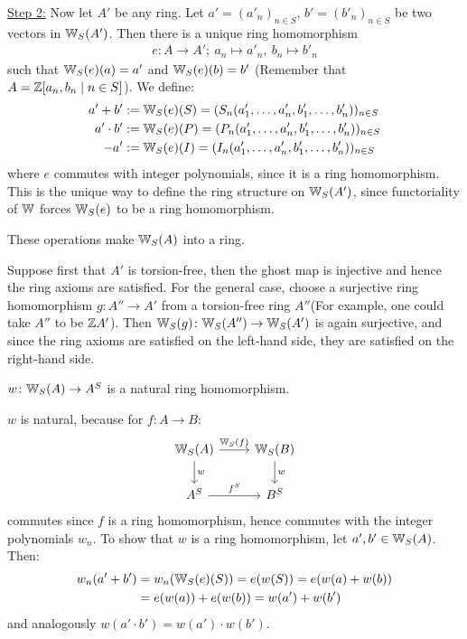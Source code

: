 \begin{bigproof}
    \underline{Step 2:} Now let $A'$ be any ring.
    Let $a' = (a'_n)_{n \in S}$, $b' = (b'_n)_{n \in S}$ be two vectors in $\mathbb{W}_S(A')$.
    Then there is a unique ring homomorphism
    \begin{align*}
        e \colon A \to A'; \
        a_n \mapsto a'_n, \
        b_n \mapsto b'_n
    \end{align*}
    such that $\mathbb{W}_S(e)(a) = a'$ and $\mathbb{W}_S(e)(b) = b'$
    (Remember that $A = \mathbb{Z}[a_n,b_n \mid n \in S]$).
    We define:
    \begin{align*}
        a'+ b' &:= \mathbb{W}_S(e)(S) 
        = (S_n(a'_1,\dots,a'_n,b'_1,\dots,b'_n))_{n \in S} \\
        a' \cdot b' &:= \mathbb{W}_S(e)(P) = (P_n(a'_1,\dots,a'_n,b'_1,\dots,b'_n))_{n \in S} \\
        -a' &:= \mathbb{W}_S(e)(I) = (I_n(a'_1,\dots,a'_n,b'_1,\dots,b'_n))_{n \in S}
    \end{align*}
    where $e$ commutes with integer polynomials, since it is a ring homomorphism.
    This is the unique way to define the ring structure on $\mathbb{W}_S(A')$, since functoriality
    of $\mathbb{W}$ forces $\mathbb{W}_S(e)$ to be a ring homomorphism.
\begin{claim*}
    These operations make $\mathbb{W}_S(A)$ into a ring.
\end{claim*}
\begin{smallproof}
    Suppose first that $A'$ is torsion-free, then the ghost map is injective
    and hence the ring axioms are satisfied.
    For the general case, choose a surjective ring homomorphism $g \colon A'' \to A'$
    from a torsion-free ring $A''$(For example, one could take $A''$ to be $\mathbb{Z} A'$).
    Then $\mathbb{W}_S (g)\colon \mathbb{W}_S(A'') \to \mathbb{W}_S(A')$ is again surjective, and since the
    ring axioms are satisfied on the left-hand side, they are satisfied on the right-hand side.
    \todo{}
\end{smallproof}
\begin{claim*}
    $w \colon \mathbb{W}_S(A) \to A^S$ is a natural ring homomorphism.
\end{claim*}
$w$ is natural, because for $f \colon A \to B$:
\[
    \begin{tikzcd}
        \W_S(A) \arrow[r,"\W_S(f)"] \arrow[d,"w"] 
          & \W_S(B) \arrow[d,"w"] \\
        A^S \arrow[r,"f^S"]
          & B^S
    \end{tikzcd}
\]
commutes since $f$ is a ring homomorphism, hence commutes with the integer polynomials $w_n$.
To show that $w$ is a ring homomorphism, let $a',b' \in \mathbb{W}_S(A)$. Then: 
\begin{align*}
    w_n(a'+b') &= w_n(\mathbb{W}_S(e)(S)) = e(w(S)) = e(w(a)+w(b)) \\
    &= e(w(a)) + e(w(b)) = w(a') +w(b')
\end{align*}
and analogously $w(a' \cdot b') = w(a') \cdot w(b')$.
\todo{}
\end{bigproof}
